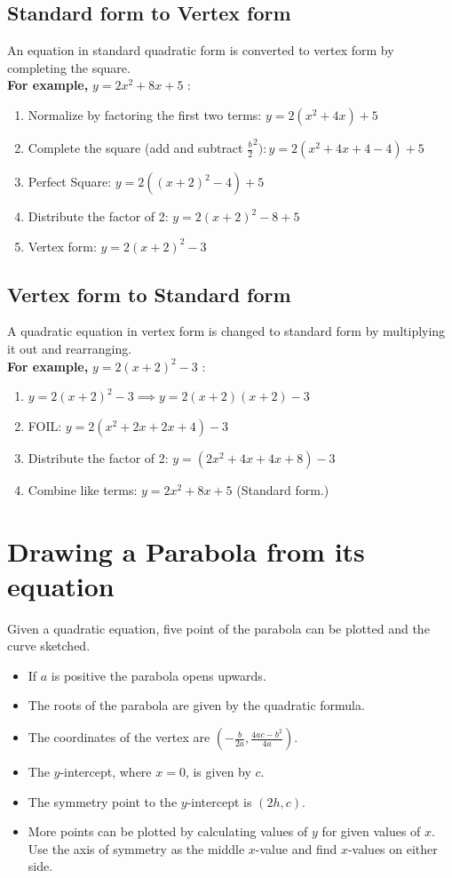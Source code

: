 \documentclass[12pt]{article}
\begin{document}
\newpage

\subsection*{Standard form to Vertex form}
An equation in standard quadratic form is converted to vertex form by completing the square.\\

\textbf{For example,} $y=2x^2+8x+5$ :
\begin{enumerate}
\item Normalize by factoring the first two terms: $y=2(x^2+4x)+5$
\item Complete the square (add and subtract $\frac{b}{2}^2): y=2(x^2+4x+4-4)+5$
\item Perfect Square: $y=2((x+2)^2-4)+5$
\item Distribute the factor of 2: $y=2(x+2)^2-8+5$
\item Vertex form: $y=2(x+2)^2-3$
\end{enumerate}

\subsection*{Vertex form to Standard form}
A quadratic equation in vertex form is changed to standard form by multiplying it out and rearranging.\\

\textbf{For example,} $y=2(x+2)^2-3$ :
\begin{enumerate}
\item $y=2(x+2)^2-3 \implies y=2(x+2)(x+2)-3$
\item FOIL: $y=2(x^2+2x+2x+4)-3$
\item Distribute the factor of 2: $y=(2x^2+4x+4x+8)-3$
\item Combine like terms: $y=2x^2+8x+5$ (Standard form.)
\end{enumerate}

\newpage

\section*{Drawing a Parabola from its equation}

Given a quadratic equation, five point of the parabola can be plotted and the curve sketched.

\begin{itemize}
    \item If $a$ is positive the parabola opens upwards.
    \item The roots of the parabola are given by the quadratic formula.
    \item The coordinates of the vertex are $(-\frac{b}{2a},\frac{4ac-b^2}{4a})$.
    \item The $y$-intercept, where $x=0$, is given by $c$.
    \item The symmetry point to the $y$-intercept is $(2h, c)$.
    \item More points can be plotted by calculating values of $y$ for given values of $x$. Use the axis of symmetry as the middle $x$-value and find $x$-values on either side.
\end{itemize}
\end{document}
